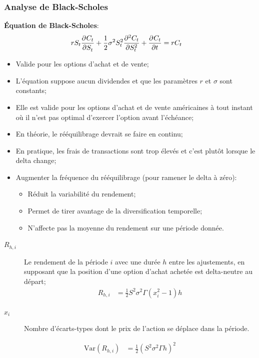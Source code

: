 \documentclass[10pt, french]{article}
\begin{document}
\begin{multicols*}{2}
\columnbreak
\subsubsection{Analyse de Black-Scholes}
\textbf{Équation de Black-Scholes}:
\begin{align*}
	r S_{t} \deriv{S_{t}}{C_{t}} + \frac{1}{2}\sigma^{2}S_{t}^{2}\deriv[2]{S_{t}}{C_{t}} + \deriv{t}{C_{t}}	
	&=	r C_{t}	
\end{align*}
\begin{itemize}
	\item	Valide pour les options d'achat et de vente;
	\item	L'équation suppose aucun dividendes et que les paramètres $r$ et $\sigma$ sont constants;
	\item	Elle est valide pour les options d'achat et de vente américaines à tout instant où il n'est pas optimal d'exercer l'option avant l'échéance;
	\item	En théorie, le rééquilibrage devrait se faire en continu;
	\item	En pratique, les frais de transactions sont trop élevés et c'est plutôt lorsque le delta change;
	\item	Augmenter la fréquence du rééquilibrage (pour ramener le delta à zéro):
		\begin{itemize}
		\item	Réduit la variabilité du rendement;
		\item	Permet de tirer avantage de la diversification temporelle;
		\item	N'affecte pas la moyenne du rendement sur une période donnée.
		\end{itemize}
\end{itemize}

\begin{description}
	\item[$R_{h, i}$]	Le rendement de la période $i$ avec une durée $h$ entre les ajustements, en  supposant que la position d'une option d'achat achetée est delta-neutre au départ;
		\begin{align*}
		R_{h, i}	
		&=	\frac{1}{2} S^{2}\sigma^{2}\Gamma(x_{i}^{2} - 1)h
		\end{align*}
	\item[$x_{i}$]	Nombre d'écarts-types dont le prix de l'action se déplace dans la période.
\end{description}
\begin{align*}
	\text{Var}(R_{h, i})
	&=	\frac{1}{2}(S^{2}\sigma^{2}\Gamma h)^{2}
\end{align*}


\end{multicols*}
\end{document}
